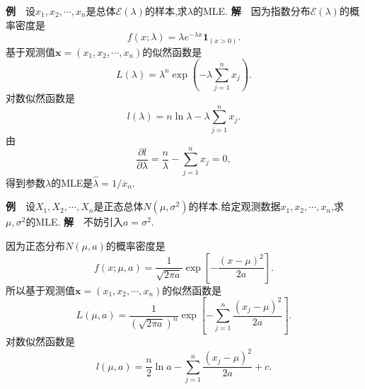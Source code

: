 	\begin{frame}
		\textbf{例}$\quad$设$x_1,x_2,\cdots,x_n$是总体$\mathcal{E}(\lambda)$的样本,求$\lambda$的MLE.
		\textbf{解}$\quad$因为指数分布$\mathcal{E}(\lambda)$的概率密度是
		\begin{equation}
			f(x;\lambda) = \lambda e^{-\lambda x}\bm{1}_{(x>0)}.
		\end{equation}
		基于观测值$\bm{x} = (x_1,x_2,\cdots,x_n)$的似然函数是
		\begin{equation}
			L(\lambda) = \lambda^n \exp(-\lambda\sum_{j=1}^nx_j).
		\end{equation}
		对数似然函数是
		\begin{equation}
			l(\lambda) = n\ln\lambda - \lambda\sum_{j=1}^nx_j.
		\end{equation}
		由
		\begin{equation}
			\frac{\partial l}{\partial \lambda} = \frac{n}{\lambda} - \sum_{j=1}^nx_j = 0,
		\end{equation}
		得到参数$\lambda$的MLE是$\widehat{\lambda} = 1/\overline{x}_n$.
	\end{frame}

	\begin{frame}
		\textbf{例}$\quad$设$X_1,X_2,\cdots,X_n$是正态总体$N(\mu,\sigma^2)$的样本.给定观测数据$x_1,x_2,\cdots,x_n$,求$\mu,\sigma^2$的MLE.
		\textbf{解}$\quad$不妨引入$a = \sigma^2$.
		
		因为正态分布$N(\mu,a)$的概率密度是
		\begin{equation}
			f(x;\mu,a) = \frac{1}{\sqrt{2\pi a}}\exp\left[-\frac{(x-\mu)^2}{2a}\right].
		\end{equation}
		所以基于观测值$\bm{x} = (x_1,x_2,\cdots,x_n)$的似然函数是
		\begin{equation}
			L(\mu,a) = \frac{1}{(\sqrt{2\pi a})^n}\exp\left[-\sum_{j=1}^n\frac{(x_j-\mu)^2}{2a}\right].
		\end{equation}
		对数似然函数是
		\begin{equation}
			l(\mu,a) = \frac{n}{2}\ln a -\sum_{j=1}^n\frac{(x_j-\mu)^2}{2a}+c.
		\end{equation}
	\end{frame}


